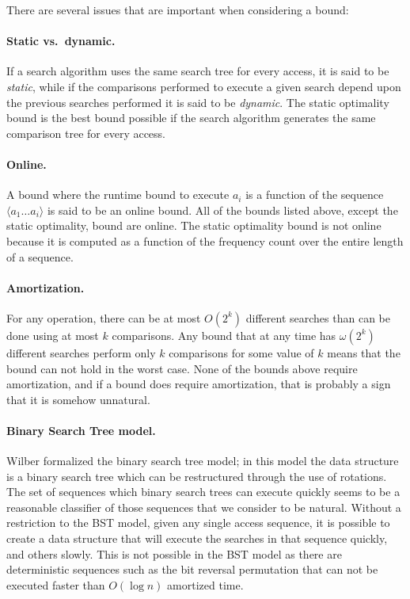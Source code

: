 \documentclass{llncs}
\newcommand{\BigOh}[1]{O\!\left(#1\right)}
\newcommand{\LittleOmega}[1]{\omega\!\left(#1\right)}
\begin{document}
\noindent
There are several issues that are important when considering a bound:

\paragraph{Static vs.~dynamic.} If a search algorithm uses the same search tree for every access, it is said to be \emph{static}, while if the comparisons performed to execute a given search depend upon the previous searches performed it is said to be \emph{dynamic}. The static optimality bound is the best bound possible if the search algorithm generates the same comparison tree for every access.

\paragraph{Online.} A bound where the runtime bound to execute $a_i$ is a function of the sequence $\langle a_1 \ldots a_i \rangle$ is said to be an online bound. All of the bounds listed above, except the static optimality, bound are online. The static optimality bound is not online because it is computed as a function of the frequency count over the entire length of a sequence.

\paragraph{Amortization.} For any operation, there can be at most $\BigOh{2^k}$ different searches than can be done using at most $k$ comparisons. Any bound that at any time has $\LittleOmega{2^k}$ different searches perform only $k$ comparisons for some value of $k$ means that the bound can not hold in the worst case. None of the bounds above require amortization, and if a bound does require amortization, that is probably a sign that it is somehow unnatural.

\paragraph{Binary Search Tree model.} Wilber \cite{DBLP:journals/siamcomp/Wilber89} formalized the binary search tree model; in this model the data structure is a binary search tree which can be restructured through the use of rotations. The set of sequences which binary search trees can execute quickly seems to be a reasonable classifier of those sequences that we consider to be natural. Without a restriction to the BST model, given any single access sequence, it is possible to create a data structure that will execute the searches in that sequence quickly, and others slowly. This is not possible in the BST model as there are deterministic sequences such as the bit reversal permutation that can not be executed faster than $\BigOh{\log n}$ amortized time.
\end{document}
